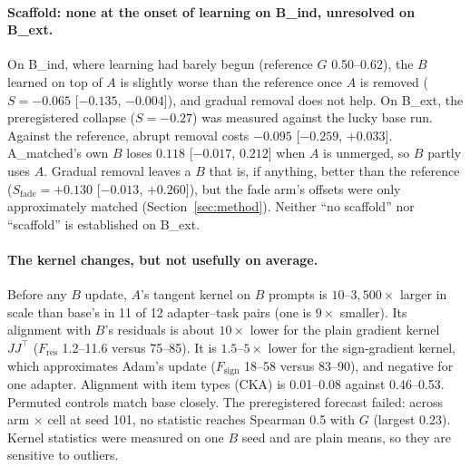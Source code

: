 \documentclass[11pt]{article}
\begin{document}
\paragraph{Scaffold: none at the onset of learning on B\_ind, unresolved on B\_ext.} On B\_ind, where learning had barely begun (reference $G$ 0.50--0.62), the $B$ learned on top of $A$ is slightly worse than the reference once $A$ is removed ($S=-0.065$ [$-0.135$, $-0.004$]), and gradual removal does not help. On B\_ext, the preregistered collapse ($S=-0.27$) was measured against the lucky base run. Against the reference, abrupt removal costs $-0.095$ [$-0.259$, $+0.033$]. A\_matched's own $B$ loses $0.118$ [$-0.017$, $0.212$] when $A$ is unmerged, so $B$ partly uses $A$. Gradual removal leaves a $B$ that is, if anything, better than the reference ($S_{\text{fade}}=+0.130$ [$-0.013$, $+0.260$]), but the fade arm's offsets were only approximately matched (Section~\ref{sec:method}). Neither ``no scaffold'' nor ``scaffold'' is established on B\_ext.

\paragraph{The kernel changes, but not usefully on average.} Before any $B$ update, $A$'s tangent kernel on $B$ prompts is $10$--$3{,}500\times$ larger in scale than base's in 11 of 12 adapter--task pairs (one is $9\times$ smaller). Its alignment with $B$'s residuals is about $10\times$ lower for the plain gradient kernel $JJ^\top$ ($F_{\text{res}}$ 1.2--11.6 versus 75--85). It is $1.5$--$5\times$ lower for the sign-gradient kernel, which approximates Adam's update ($F_{\text{sign}}$ 18--58 versus 83--90), and negative for one adapter. Alignment with item types (CKA) is 0.01--0.08 against 0.46--0.53. Permuted controls match base closely. The preregistered forecast failed: across arm $\times$ cell at seed 101, no statistic reaches Spearman 0.5 with $G$ (largest 0.23). Kernel statistics were measured on one $B$ seed and are plain means, so they are sensitive to outliers.
\end{document}
